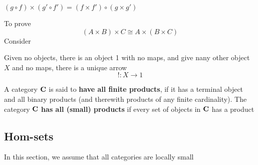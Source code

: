 \documentclass[11pt]{article}
\begin{document}
\begin{center}\end{center}
\((g\circ f)\times(g'\circ f')=(f\times f')\circ(g\times g')\)



To prove
\begin{equation*}
(A\times B)\times C\cong A\times (B\times C)
\end{equation*}
Consider
\begin{center}\end{center}


Given no objects, there is an object 1 with no maps, and give nany other
object \(X\) and no maps, there is a unique arrow
\begin{equation*}
!:X\to 1
\end{equation*}

\begin{definition}[]
A category \(\operatorname{\textbf{C}}\) is said to \textbf{have all finite products}, if it has a terminal
object and all binary products (and therewith products of any finite
cardinality). The category \(\operatorname{\textbf{C}}\) \textbf{has all (small) products} if every set of
objects in \(\operatorname{\textbf{C}}\) has a product
\end{definition}


\subsection{Hom-sets}
\label{sec:org3ea047a}
In this section, we assume that all categories are locally small
\end{document}
